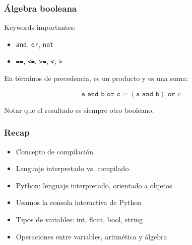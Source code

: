 \documentclass[14pt,aspectratio=169,xcolor=dvipsnames]{beamer}
\begin{document}
\begin{frame}\frametitle{Álgebra booleana}
    Keywords importantes: 
    \begin{itemize}
        \item \texttt{and}, \texttt{or}, \texttt{not}
        \item \texttt{==}, \texttt{<=}, \texttt{>=}, \texttt{<}, \texttt{>}
    \end{itemize}

En términos de precedencia,  es un producto y  es una suma: 

$$ \texttt{a and b or c} = (\texttt{a and b}) \texttt{ or } c $$

Notar que el resultado es siempre otro booleano.
\end{frame}
\begin{frame}\frametitle{Recap}
    \begin{itemize}
        \item Concepto de compilación
        \item Lenguaje interpretado vs. compilado
        \item Python: lenguaje interpretado, orientado a objetos
        \item Usamos la consola interactiva de Python
        \item Tipos de variables: int, float, bool, string
        \item Operaciones entre variables, aritmética y álgebra

    \end{itemize}
\end{frame}
\begin{frame}
    \maketitle
\end{frame}
\end{document}
